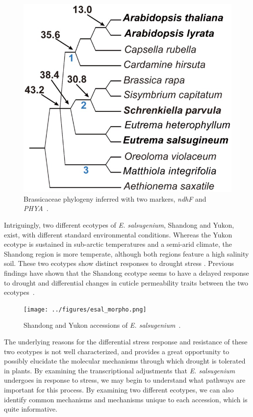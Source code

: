 \documentclass[12pt]{article}
\newcommand{\esal}{\textit{E. salsugenium}}
\begin{document}
		\begin{figure}[H]
			\centering
			\includegraphics[scale=2]{../figures/esal_phylo.jpg}
			\caption[Brassicaceae Phylogeny]{Brassicaceae phylogeny inferred with two markers, \textit{ndhF} and \textit{PHYA}~\cite{yang2013reference}.}
			\label{phylo}
		\end{figure}
		
	Intriguingly, two different ecotypes of \esal{}, Shandong and Yukon, exist, with different standard environmental conditions. Whereas the Yukon ecotype is sustained in sub-arctic temperatures and a semi-arid climate, the Shandong region is more temperate, although both regions feature a high salinity soil. These two ecotypes show distinct responses to drought stress \cite{xu2014leaf}. Previous findings have shown that the Shandong ecotype seems to have a delayed response to drought and differential changes in cuticle permeability traits between the two ecotypes~\cite{macleod2015exposure}. 
	
		\begin{figure}[H]
			\centering
			\texttt{[image: ../figures/esal\_morpho.png]}
			\caption[Shandong and Yukon ecotype morphology]{Shandong and Yukon accessions of \esal{}~\cite{macleod2015exposure}.}
			\label{morpho}
		\end{figure}
		
	The underlying reasons for the differential stress response and resistance of these two ecotypes is not well characterized, and provides a great opportunity to possibly elucidate the molecular mechanisms through which drought is tolerated in plants. By examining the transcriptional adjustments that \esal{} undergoes in response to stress, we may begin to understand what pathways are important for this process. By examining two different ecotypes, we can also identify common mechanisms and mechanisms unique to each accession, which is quite informative. 
	
\end{document}
